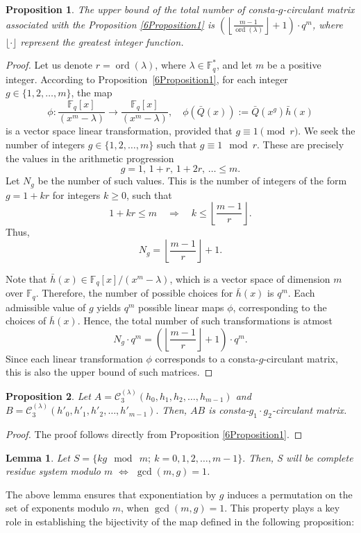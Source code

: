 \documentclass[12pt]{article}
\newtheorem{proposition}{Proposition}
\newtheorem{lemma}{Lemma}
\begin{document}
\begin{proposition}\label{6counting1}
The upper bound of the total number of consta-$g$-circulant matrix associated with the Proposition \ref{6Proposition1} is $\left( \left\lfloor \frac{m - 1}{\operatorname{ord}(\lambda)} \right\rfloor + 1 \right) \cdot q^m$, where  $\lfloor \cdot \rfloor$ represent the greatest integer function.
\end{proposition}\label{6Proposition002}
\begin{proof}
	Let us denote \( r = \operatorname{ord}(\lambda) \), where \( \lambda \in \mathbb{F}_q^* \), and let \( m \) be a positive integer. According to Proposition~\ref{6Proposition1}, for each integer \( g \in \{1, 2, \dots, m\} \), the map
	\[
	\phi: \frac{\mathbb{F}_q[x]}{(x^m - \lambda)} \to \frac{\mathbb{F}_q[x]}{(x^m - \lambda)}, \quad \phi(\bar{Q}(x)) := \bar{Q}(x^g)\bar{h}(x)
	\]
	is a vector space linear transformation, provided that
	\(
	g \equiv 1 \pmod{r}.
	\) We seek the number of integers \( g \in \{1, 2, \dots, m\} \) such that \( g \equiv 1 \mod r \). These are precisely the values in the arithmetic progression
	\[
	g = 1,\, 1 + r,\, 1 + 2r,\, \dotsc \leq m.
	\]
	Let \( N_g \) be the number of such values. This is the number of integers of the form \( g = 1 + kr \) for integers \( k \geq 0 \), such that
	\[
	1 + kr \leq m \quad \Rightarrow \quad k \leq \left\lfloor \frac{m - 1}{r} \right\rfloor.
	\]
	Thus,
	\[
	N_g = \left\lfloor \frac{m - 1}{r} \right\rfloor + 1.
	\]
	
\noindent 	Note that \( \bar{h}(x) \in \mathbb{F}_q[x]/(x^m - \lambda) \), which is a vector space of dimension \( m \) over \( \mathbb{F}_q \). Therefore, the number of possible choices for \( \bar{h}(x) \) is $q^m.$ Each admissible value of \( g \) yields \( q^m \) possible linear maps \( \phi \), corresponding to the choices of \( \bar{h}(x) \). Hence, the total number of such transformations is atmost
	$$ N_g \cdot q^m = \left( \left\lfloor \frac{m - 1}{r} \right\rfloor + 1 \right) \cdot q^m.
	$$
	Since each linear transformation \( \phi \) corresponds to a consta-$g$-circulant matrix, this is also the upper bound of  such matrices.
	
\end{proof}
\begin{proposition}
	Let $A=\mathcal{C}_3^{(\lambda)}(h_0, h_1,h_2,\dots, h_{m-1})$ and $B=\mathcal{C}_3^{(\lambda)}(h'_0, h'_1,h'_2,\dots, h'_{m-1}).$ Then, $AB$ is consta-$g_1\cdot g_2$-circulant matrix.
\end{proposition}
\begin{proof}
	The proof follows directly from Proposition \ref{6Proposition1}.
	
\end{proof}
\begin{lemma}\cite[Lemma 3.16]{Chatterjee2024Anote}\label{6Lemma2}
	Let $S=\{kg \mod~m;~k=0,1,2,\dots,m-1\}.$ Then, S will be complete residue system modulo $m$ $\iff$ $\gcd(m,g)=1$.
\end{lemma}
The above lemma ensures that exponentiation by \(g\) induces a permutation on the set of exponents modulo \(m\), when \(\gcd(m, g) = 1\). This property plays a key role in establishing the bijectivity of the map defined in the following proposition:
\end{document}
